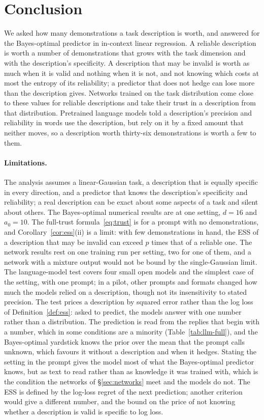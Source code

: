 \documentclass{article}
\begin{document}
\section{Conclusion}
We asked how many demonstrations a task description is worth, and answered for the Bayes-optimal predictor in in-context linear regression. A reliable description is worth a number of demonstrations that grows with the task dimension and with the description's specificity. A description that may be invalid is worth as much when it is valid and nothing when it is not, and not knowing which costs at most the entropy of its reliability; a predictor that does not hedge can lose more than the description gives. Networks trained on the task distribution come close to these values for reliable descriptions and take their trust in a description from that distribution. Pretrained language models told a description's precision and reliability in words use the description, but rely on it by a fixed amount that neither moves, so a description worth thirty-six demonstrations is worth a few to them.

\paragraph{Limitations.} The analysis assumes a linear-Gaussian task, a description that is equally specific in every direction, and a predictor that knows the description's specificity and reliability; a real description can be exact about some aspects of a task and silent about others. The Bayes-optimal numerical results are at one setting, $d = 16$ and $a_0 = 10$. The full-trust formula~\eqref{eq:trust} is for a prompt with no demonstrations, and Corollary~\ref{cor:ess}(ii) is a limit: with few demonstrations in hand, the ESS of a description that may be invalid can exceed $p$ times that of a reliable one. The network results rest on one training run per setting, two for one of them, and a network with a mixture output would not be bound by the single-Gaussian limit. The language-model test covers four small open models and the simplest case of the setting, with one prompt; in a pilot, other prompts and formats changed how much the models relied on a description, though not its insensitivity to stated precision. The test prices a description by squared error rather than the log loss of Definition~\ref{def:ess}: asked to predict, the models answer with one number rather than a distribution. The prediction is read from the replies that begin with a number, which in some conditions are a minority (Table~\ref{tab:llm-full}), and the Bayes-optimal yardstick knows the prior over the mean that the prompt calls unknown, which favours it without a description and when it hedges. Stating the setting in the prompt gives the model most of what the Bayes-optimal predictor knows, but as text to read rather than as knowledge it was trained with, which is the condition the networks of \S\ref{sec:networks} meet and the models do not. The ESS is defined by the log-loss regret of the next prediction; another criterion would give a different number, and the bound on the price of not knowing whether a description is valid is specific to log loss.
\end{document}
